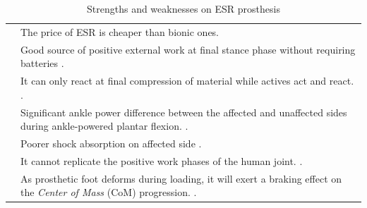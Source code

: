 \documentclass[12pt,english]{article}
\providecommand{\tabularnewline}{\\}
\begin{document}
\begin{center}
\begin{table}[H]
\caption{\label{tab:Fortalezas,-debilidades-ESR}Strengths and weaknesses on ESR prosthesis}


\centering{}%
\begin{tabular}{|>{\raggedright}p{3cm}|>{\centering}p{13cm}|}
\hline 
\multirow{2}{3cm}{\textbf{Passive prosthesis strengths}} & The price of ESR is cheaper than bionic ones.\tabularnewline
\cline{2-2} 
 & Good source of positive external work at final stance phase without requiring batteries \cite{Zelik2014}.\tabularnewline
\hline 
\hline 
\multirow{5}{3cm}{\textbf{Passive prosthesis weaknesses}} & It can only react at final compression of material while actives act and react. \cite{Varol2010}.\tabularnewline
\cline{2-2} 
 & Significant ankle power difference between the affected and unaffected sides during ankle-powered plantar flexion. \cite{Au2009,herr2014powered}.\tabularnewline
\cline{2-2} 
 & Poorer shock absorption on affected side \cite{Au2008}. \tabularnewline
\cline{2-2} 
 & It cannot replicate the positive work phases of the human joint. \cite{Martinez-Villalpando2009,Esposito2015}.\tabularnewline
\cline{2-2} 
 & As prosthetic foot deforms during loading, it will exert a braking effect on the \emph{Center of Mass} (CoM\nomenclature{CoM}{Center of Mass}) progression. \cite{DeAsha2014}.\tabularnewline
\hline 
\end{tabular}
\end{table}

\par\end{center}
\end{document}
